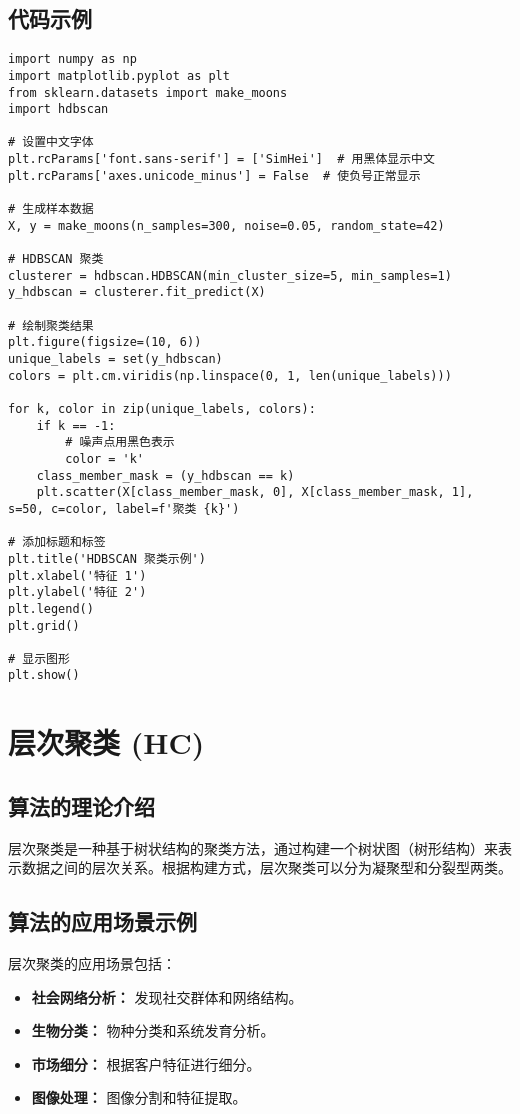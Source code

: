 \subsection*{代码示例}
\begin{lstlisting}
import numpy as np
import matplotlib.pyplot as plt
from sklearn.datasets import make_moons
import hdbscan

# 设置中文字体
plt.rcParams['font.sans-serif'] = ['SimHei']  # 用黑体显示中文
plt.rcParams['axes.unicode_minus'] = False  # 使负号正常显示

# 生成样本数据
X, y = make_moons(n_samples=300, noise=0.05, random_state=42)

# HDBSCAN 聚类
clusterer = hdbscan.HDBSCAN(min_cluster_size=5, min_samples=1)
y_hdbscan = clusterer.fit_predict(X)

# 绘制聚类结果
plt.figure(figsize=(10, 6))
unique_labels = set(y_hdbscan)
colors = plt.cm.viridis(np.linspace(0, 1, len(unique_labels)))

for k, color in zip(unique_labels, colors):
    if k == -1:
        # 噪声点用黑色表示
        color = 'k'
    class_member_mask = (y_hdbscan == k)
    plt.scatter(X[class_member_mask, 0], X[class_member_mask, 1], s=50, c=color, label=f'聚类 {k}')

# 添加标题和标签
plt.title('HDBSCAN 聚类示例')
plt.xlabel('特征 1')
plt.ylabel('特征 2')
plt.legend()
plt.grid()

# 显示图形
plt.show()

\end{lstlisting}


\section{层次聚类 (HC)}
\subsection*{算法的理论介绍}
层次聚类是一种基于树状结构的聚类方法，通过构建一个树状图（树形结构）来表示数据之间的层次关系。根据构建方式，层次聚类可以分为凝聚型和分裂型两类。

\subsection*{算法的应用场景示例}
层次聚类的应用场景包括：
\begin{itemize}
    \item \textbf{社会网络分析：} 发现社交群体和网络结构。
    \item \textbf{生物分类：} 物种分类和系统发育分析。
    \item \textbf{市场细分：} 根据客户特征进行细分。
    \item \textbf{图像处理：} 图像分割和特征提取。
\end{itemize}

